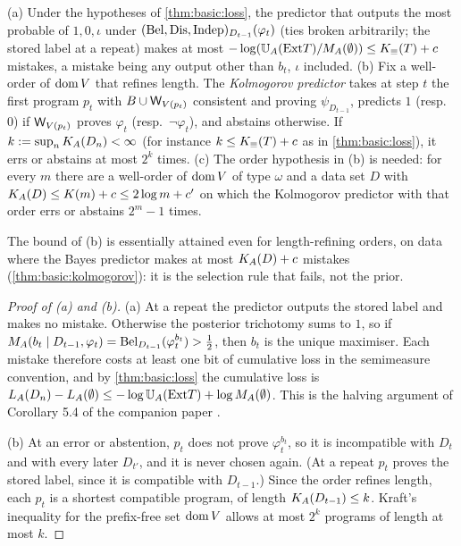 \begin{proposition}\label{prop:basic:mistakes}
(a) Under the hypotheses of \cref{thm:basic:loss}, the predictor that outputs the most probable of $1,0,\iota$ under $(\mathrm{Bel},\mathrm{Dis},\mathrm{Indep})_{D_{t-1}}(\varphi_t)$ (ties broken arbitrarily; the stored label at a repeat) makes at most $-\log(\mathbb{U}_{A}(\mathrm{Ext} T)/M_{A}(\emptyset))\le K_{\equiv}(T)+c$ mistakes, a mistake being any output other than $b_t$, $\iota$ included. (b) Fix a well-order of $\operatorname{dom} V$ that refines length. The \emph{Kolmogorov predictor} takes at step $t$ the first program $p_t$ with $B\cup\mathsf{W}_{V(p_t)}$ consistent and proving $\psi_{D_{t-1}}$, predicts $1$ (resp.\ $0$) if $\mathsf{W}_{V(p_t)}$ proves $\varphi_t$ (resp.\ $\neg\varphi_t$), and abstains otherwise. If $k:=\sup_nK_{A}(D_n)<\infty$ (for instance $k\le K_{\equiv}(T)+c$ as in \cref{thm:basic:loss}), it errs or abstains at most $2^k$ times. (c) The order hypothesis in (b) is needed: for every $m$ there are a well-order of $\operatorname{dom} V$ of type $\omega$ and a data set $D$ with $K_{A}(D)\le K(m)+c\le2\log m+c'$ on which the Kolmogorov predictor with that order errs or abstains $2^m-1$ times.
\end{proposition}

The bound of (b) is essentially attained even for length-refining orders, on data where the Bayes predictor makes at most $K_{A}(D)+c$ mistakes (\cref{thm:basic:kolmogorov}): it is the selection rule that fails, not the prior.

\begin{proof}[Proof of (a) and (b)]
(a) At a repeat the predictor outputs the stored label and makes no mistake. Otherwise the posterior trichotomy sums to $1$, so if $M_{A}(b_t\mid D_{t-1},\varphi_t)=\mathrm{Bel}_{D_{t-1}}(\varphi_t^{b_t})>\frac12$, then $b_t$ is the unique maximiser. Each mistake therefore costs at least one bit of cumulative loss in the semimeasure convention, and by \cref{thm:basic:loss} the cumulative loss is $L_{A}(D_n)-L_{A}(\emptyset)\le-\log\mathbb{U}_{A}(\mathrm{Ext} T)+\log M_{A}(\emptyset)$. This is the halving argument of Corollary 5.4 of the companion paper \citep{claudeSFI2026fundamentals}.

(b) At an error or abstention, $p_t$ does not prove $\varphi_t^{b_t}$, so it is incompatible with $D_t$ and with every later $D_{t'}$, and it is never chosen again. (At a repeat $p_t$ proves the stored label, since it is compatible with $D_{t-1}$.) Since the order refines length, each $p_t$ is a shortest compatible program, of length $K_{A}(D_{t-1})\le k$. Kraft's inequality for the prefix-free set $\operatorname{dom} V$ allows at most $2^k$ programs of length at most $k$.
\end{proof}

